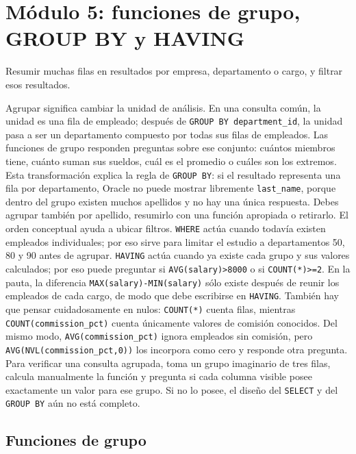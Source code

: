 \documentclass[11pt,a4paper]{article}
\newcommand{\campo}[1]{\texttt{#1}}
\begin{document}
\section{Módulo 5: funciones de grupo, GROUP BY y HAVING}

\begin{objetivo}
Resumir muchas filas en resultados por empresa, departamento o cargo, y filtrar esos resultados.
\end{objetivo}

Agrupar significa cambiar la unidad de análisis. En una consulta común, la unidad es una fila de
empleado; después de \campo{GROUP BY department_id}, la unidad pasa a ser un departamento compuesto
por todas sus filas de empleados. Las funciones de grupo responden preguntas sobre ese conjunto:
cuántos miembros tiene, cuánto suman sus sueldos, cuál es el promedio o cuáles son los extremos. Esta
transformación explica la regla de \campo{GROUP BY}: si el resultado representa una fila por
departamento, Oracle no puede mostrar libremente \campo{last_name}, porque dentro del grupo existen
muchos apellidos y no hay una única respuesta. Debes agrupar también por apellido, resumirlo con una
función apropiada o retirarlo. El orden conceptual ayuda a ubicar filtros. \campo{WHERE} actúa cuando
todavía existen empleados individuales; por eso sirve para limitar el estudio a departamentos 50, 80
y 90 antes de agrupar. \campo{HAVING} actúa cuando ya existe cada grupo y sus valores calculados; por
eso puede preguntar si \campo{AVG(salary)>8000} o si \campo{COUNT(*)>=2}. En la pauta, la diferencia
\campo{MAX(salary)-MIN(salary)} sólo existe después de reunir los empleados de cada cargo, de modo que
debe escribirse en \campo{HAVING}. También hay que pensar cuidadosamente en nulos:
\campo{COUNT(*)} cuenta filas, mientras \campo{COUNT(commission_pct)} cuenta únicamente valores de
comisión conocidos. Del mismo modo, \campo{AVG(commission_pct)} ignora empleados sin comisión, pero
\campo{AVG(NVL(commission_pct,0))} los incorpora como cero y responde otra pregunta. Para verificar
una consulta agrupada, toma un grupo imaginario de tres filas, calcula manualmente la función y
pregunta si cada columna visible posee exactamente un valor para ese grupo. Si no lo posee, el diseño
del \campo{SELECT} y del \campo{GROUP BY} aún no está completo.

\subsection{Funciones de grupo}
\end{document}
